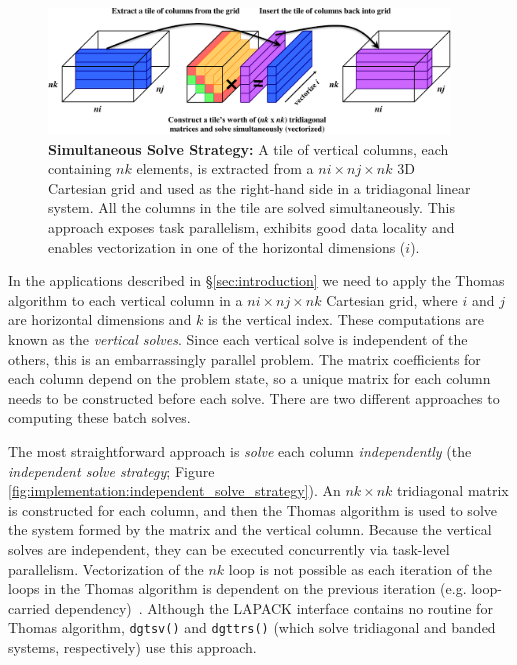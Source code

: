 \documentclass{sig-alternate-05-2015}
\begin{document}
\begin{figure}[!bt]
  \centering
  \caption{
    \textbf{Simultaneous Solve Strategy:} A tile of vertical columns, each 
      containing \(nk\) elements, is extracted from a \(ni \times nj \times nk\)
      3D Cartesian grid and used as the right-hand side in a tridiagonal linear
      system.
    All the columns in the tile are solved simultaneously.
    This approach exposes task parallelism, exhibits good data locality and
      enables vectorization in one of the horizontal dimensions (\(i\)).
  }
  \label{fig:implementation:simultaneous_solve_strategy}
  \includegraphics[width=0.95\textwidth]{figures/simultaneous_solve.pdf}
\end{figure}

In the applications described in \S\ref{sec:introduction} we need to apply the
  Thomas algorithm to each vertical column in a \(ni \times nj \times nk\)
  Cartesian grid, where \(i\) and \(j\) are horizontal dimensions and \(k\) is
  the vertical index.
These computations are known as the \emph{vertical solves}.
Since each vertical solve is independent of the others, this is an
  embarrassingly parallel problem.
The matrix coefficients for each column depend on the problem state, so a
  unique matrix for each column needs to be constructed before each solve.
There are two different approaches to computing these batch solves.

The most straightforward approach is \emph{solve} each column
  \emph{independently} (the \emph{independent solve strategy}; Figure
  \ref{fig:implementation:independent_solve_strategy}).
An \(nk \times nk\) tridiagonal matrix is constructed for each column, and then
  the Thomas algorithm is used to solve the system formed by the matrix and the
  vertical column.
Because the vertical solves are independent, they can be executed concurrently
  via task-level parallelism.
Vectorization of the \(nk\) loop is not possible as each iteration of the loops
  in the Thomas algorithm is dependent on the previous iteration (e.g.
  loop-carried dependency)~\cite{povitsky}.
Although the LAPACK interface contains no routine for Thomas algorithm,
  \lstinline{dgtsv()} and \lstinline{dgttrs()} (which solve tridiagonal and
  banded systems, respectively) use this approach.
\end{document}
